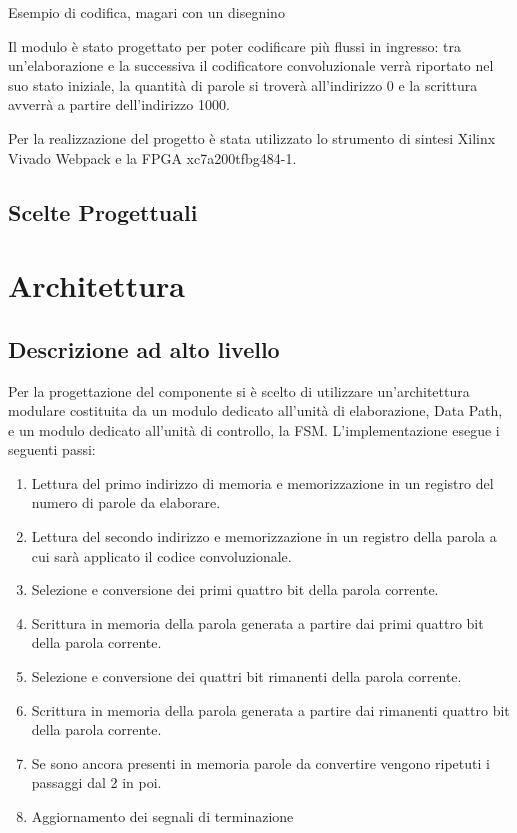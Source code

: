 \documentclass[a4paper]{article}
\begin{document}
Esempio di codifica, magari con un disegnino
\newline


Il modulo è stato progettato per poter codificare più flussi in ingresso: tra un'elaborazione e la successiva il codificatore convoluzionale verrà riportato nel suo stato iniziale, la quantità di parole si troverà all'indirizzo 0 e la scrittura avverrà a partire dell'indirizzo 1000. 
\newline

Per la realizzazione del progetto è stata utilizzato lo strumento di sintesi Xilinx Vivado Webpack e la FPGA  xc7a200tfbg484-1.

\subsection{Scelte Progettuali}

\newpage
\section{Architettura}
\subsection{Descrizione ad alto livello}
Per la progettazione del componente si è scelto di utilizzare un'architettura modulare costituita da un modulo dedicato all'unità di elaborazione, Data Path, e un modulo dedicato all'unità di controllo, la FSM. 
\newline
L'implementazione esegue i seguenti passi:
\begin{enumerate}
	\item Lettura del primo indirizzo di memoria e memorizzazione in un registro del numero di parole da elaborare. 
	\item Lettura del secondo indirizzo e memorizzazione in un registro della parola a cui sarà applicato il codice convoluzionale.
	\item Selezione e conversione dei primi quattro bit della parola corrente.
	\item Scrittura in memoria della parola generata a partire dai primi quattro bit della parola corrente.
	\item Selezione e conversione dei quattri bit rimanenti della parola corrente.
	\item Scrittura in memoria della parola generata a partire dai rimanenti quattro bit della parola corrente.
	\item Se sono ancora presenti in memoria parole da convertire vengono ripetuti i passaggi dal 2 in poi. 
	\item Aggiornamento dei segnali di terminazione 
\end{enumerate}
\end{document}
